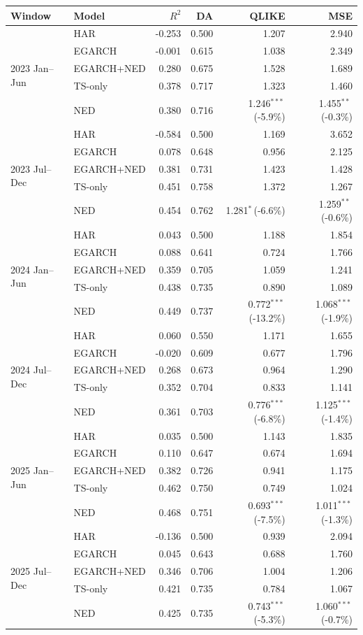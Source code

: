 \begin{tabular}{@{}llrrrr@{}}
\toprule
Window & Model & $R^2$ & DA & QLIKE & MSE \\
\midrule
\multirow{5}{*}{2023 Jan--Jun} & HAR & -0.253 & 0.500 & 1.207 & 2.940 \\
 & EGARCH & -0.001 & 0.615 & 1.038 & 2.349 \\
 & EGARCH+NED & 0.280 & 0.675 & 1.528 & 1.689 \\
 & TS-only & 0.378 & 0.717 & 1.323 & 1.460 \\
 & NED & 0.380 & 0.716 & 1.246$^{***}$\,(-5.9\%) & 1.455$^{**}$\,(-0.3\%) \\
\midrule
\multirow{5}{*}{2023 Jul--Dec} & HAR & -0.584 & 0.500 & 1.169 & 3.652 \\
 & EGARCH & 0.078 & 0.648 & 0.956 & 2.125 \\
 & EGARCH+NED & 0.381 & 0.731 & 1.423 & 1.428 \\
 & TS-only & 0.451 & 0.758 & 1.372 & 1.267 \\
 & NED & 0.454 & 0.762 & 1.281$^{*}$\,(-6.6\%) & 1.259$^{**}$\,(-0.6\%) \\
\midrule
\multirow{5}{*}{2024 Jan--Jun} & HAR & 0.043 & 0.500 & 1.188 & 1.854 \\
 & EGARCH & 0.088 & 0.641 & 0.724 & 1.766 \\
 & EGARCH+NED & 0.359 & 0.705 & 1.059 & 1.241 \\
 & TS-only & 0.438 & 0.735 & 0.890 & 1.089 \\
 & NED & 0.449 & 0.737 & 0.772$^{***}$\,(-13.2\%) & 1.068$^{***}$\,(-1.9\%) \\
\midrule
\multirow{5}{*}{2024 Jul--Dec} & HAR & 0.060 & 0.550 & 1.171 & 1.655 \\
 & EGARCH & -0.020 & 0.609 & 0.677 & 1.796 \\
 & EGARCH+NED & 0.268 & 0.673 & 0.964 & 1.290 \\
 & TS-only & 0.352 & 0.704 & 0.833 & 1.141 \\
 & NED & 0.361 & 0.703 & 0.776$^{***}$\,(-6.8\%) & 1.125$^{***}$\,(-1.4\%) \\
\midrule
\multirow{5}{*}{2025 Jan--Jun} & HAR & 0.035 & 0.500 & 1.143 & 1.835 \\
 & EGARCH & 0.110 & 0.647 & 0.674 & 1.694 \\
 & EGARCH+NED & 0.382 & 0.726 & 0.941 & 1.175 \\
 & TS-only & 0.462 & 0.750 & 0.749 & 1.024 \\
 & NED & 0.468 & 0.751 & 0.693$^{***}$\,(-7.5\%) & 1.011$^{***}$\,(-1.3\%) \\
\midrule
\multirow{5}{*}{2025 Jul--Dec} & HAR & -0.136 & 0.500 & 0.939 & 2.094 \\
 & EGARCH & 0.045 & 0.643 & 0.688 & 1.760 \\
 & EGARCH+NED & 0.346 & 0.706 & 1.004 & 1.206 \\
 & TS-only & 0.421 & 0.735 & 0.784 & 1.067 \\
 & NED & 0.425 & 0.735 & 0.743$^{***}$\,(-5.3\%) & 1.060$^{***}$\,(-0.7\%) \\
\bottomrule
\end{tabular}
